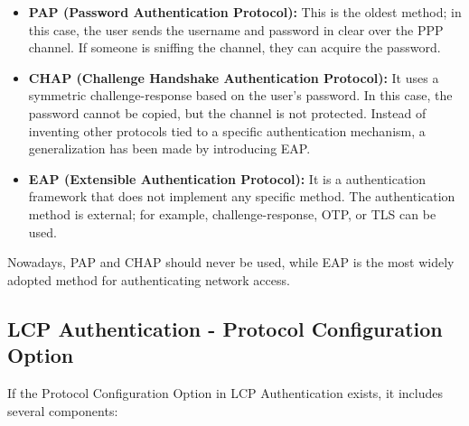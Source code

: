 \begin{itemize}
    \item \textbf{PAP (Password Authentication Protocol):} This is the oldest method; in this case, the user sends the username and password in clear over the PPP channel. If someone is sniffing the channel, they can acquire the password.

    \item \textbf{CHAP (Challenge Handshake Authentication Protocol):} It uses a symmetric challenge-response based on the user's password. In this case, the password cannot be copied, but the channel is not protected. Instead of inventing other protocols tied to a specific authentication mechanism, a generalization has been made by introducing EAP.

    \item \textbf{EAP (Extensible Authentication Protocol):} It is a authentication framework that does not implement any specific method. The authentication method is external; for example, challenge-response, OTP, or TLS can be used.
\end{itemize}

Nowadays, PAP and CHAP should never be used, while EAP is the most widely adopted method for authenticating network access.

\subsection{LCP Authentication - Protocol
    Configuration Option}
If the Protocol Configuration Option in LCP Authentication exists, it includes several components:

